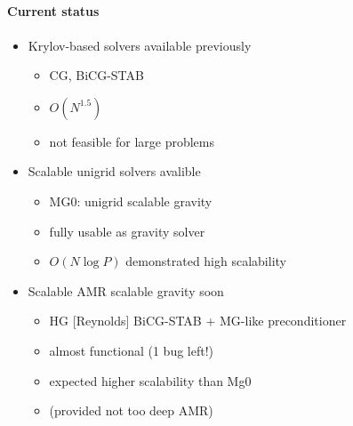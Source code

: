 \NEWSEC


\subsection{\ssRecentGravity}



%  
%
\begin{frame}[fragile,label=ss-recent-gravity] 
\secframetitle{\ssRecentGravity}
\framesubtitle{Current status}
\begin{itemize}
   \item Krylov-based solvers available previously
\begin{itemize}
   \item        CG, BiCG-STAB
 \item       $O(N^{1.5})$
\item       not feasible for large problems
\end{itemize}
   \item Scalable unigrid solvers avalible
\begin{itemize}
   \item        MG0: unigrid scalable gravity
\item         fully usable as gravity solver
\item         $O(N \log P)$
         demonstrated high scalability
\end{itemize}
   \item  Scalable AMR scalable gravity soon
\begin{itemize}
\item HG [Reynolds] BiCG-STAB + MG-like preconditioner
\item         almost functional (1 bug left!)
\item         expected higher scalability than Mg0
\item          (provided not too deep AMR)
\end{itemize}
\end{itemize}
\end{frame}
%
%
